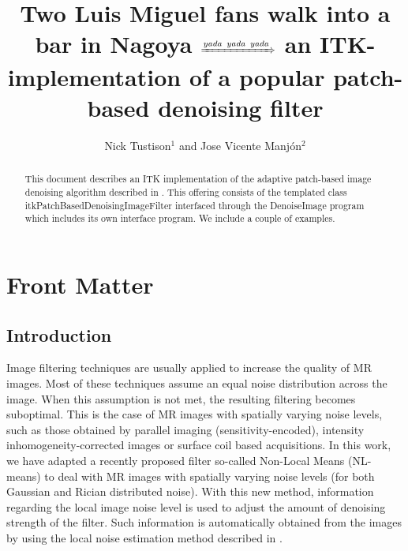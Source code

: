 \documentclass{InsightArticle}
\title{Two Luis Miguel fans walk into a bar in Nagoya $\xRightarrow[]{yada\,\,\,yada\,\,\,yada}$
an ITK-implementation of a popular patch-based denoising filter}
\author{Nick Tustison$^{1}$ and Jose Vicente Manj\'on$^{2}$}
\newcommand{\IJhandlerIDnumber}{3564}
\begin{document}
%
%
\IJhandlefooter{\IJhandlerIDnumber}




\maketitle


\ifhtml
\chapter*{Front Matter\label{front}}
\fi


\begin{abstract}
\noindent
This document describes an ITK implementation of the adaptive patch-based
image denoising algorithm described in \cite{Manjon:2010aa}.  This offering consists
of the templated class itkPatchBasedDenoisingImageFilter interfaced through
the DenoiseImage program which includes its own interface program.  We include
a couple of examples.
\end{abstract}

\IJhandlenote{\IJhandlerIDnumber}


\section{Introduction}

Image filtering techniques are usually applied to increase the quality of MR images.
Most of these techniques assume an equal noise distribution across the image. When this
assumption is not met, the resulting filtering becomes suboptimal. This is the case of MR
images with spatially varying noise levels, such as those obtained by parallel imaging
(sensitivity-encoded), intensity inhomogeneity-corrected images or surface coil based
acquisitions. In this work, we have adapted a recently proposed filter so-called
Non-Local Means (NL-means) to deal with MR images with spatially varying noise levels
(for both Gaussian and Rician distributed noise). With this new method, information
regarding the local image noise level is used to adjust the amount of denoising strength
of the filter. Such information is automatically obtained from the images by using the
local noise estimation method described in \cite{Manjon:2010aa}.
\end{document}
